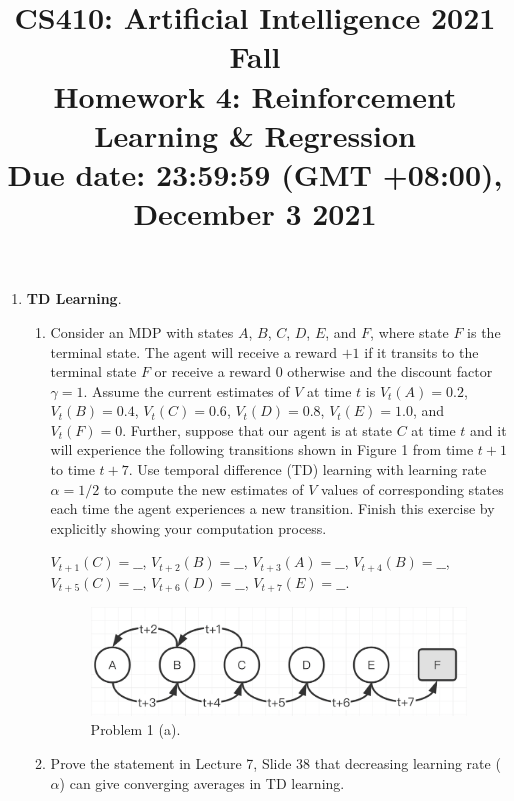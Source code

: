 \documentclass{article}
\title{\normalsize
CS410: Artificial Intelligence 2021 Fall\\
Homework 4: Reinforcement
Learning \& Regression \\
Due date: 23:59:59 (GMT +08:00), December 3 2021}
\author{}
\date{}
\begin{document}
 
\maketitle

\begin{enumerate}
    \item \textbf{TD Learning}.
    \begin{enumerate}
        \item     	Consider an MDP with states $A$, $B$, $C$, $D$, $E$, and $F$, where state $F$ is the terminal state. The agent will receive a reward $+1$ if it transits to the terminal state $F$ or receive a reward $0$ otherwise and the discount factor $\gamma=1$. Assume the current estimates of $V$ at time $t$ is $V_t (A)=0.2$,  $V_t (B)=0.4$,  $V_t (C)=0.6$,  $V_t (D)=0.8$,  $V_t (E)=1.0$, and $V_t (F)=0$. Further, suppose that our agent is at state $C$ at time $t$ and it will experience the following transitions shown in Figure 1 from time $t+1$ to time $t+7$. Use temporal difference (TD) learning with learning rate $\alpha=1/2$ to compute the new estimates of $V$ values of corresponding states each time the agent experiences a new transition. Finish this exercise by explicitly showing your computation process.
    
    
    $V_{t+1}(C)=\_\_$,
    $V_{t+2}(B)=\_\_$,
    $V_{t+3}(A)=\_\_$,
    $V_{t+4}(B)=\_\_$,\\
    $V_{t+5}(C)=\_\_$,
    $V_{t+6}(D)=\_\_$,
    $V_{t+7}(E)=\_\_$.
    
    	\begin{figure}[!htp]
    	    \centering
    	    \includegraphics[width=12cm]{figs/fig1.png}
    	    \caption{Problem 1 (a).}
    	    \label{fig:p4}
    	\end{figure}
    	\item 	Prove the statement in Lecture 7, Slide 38 that decreasing learning rate ($\alpha$) can give converging averages in TD learning.
    	

\end{enumerate}
\end{enumerate}
\end{document}
